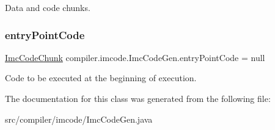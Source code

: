 Data and code chunks. \mbox{\label{classcompiler_1_1imcode_1_1_imc_code_gen_a90627f4366267feaf055da9d6d538054}} 
\subsubsection{\texorpdfstring{entry\+Point\+Code}{entryPointCode}}
{\footnotesize\ttfamily \hyperlink{classcompiler_1_1imcode_1_1_imc_code_chunk}{Imc\+Code\+Chunk} compiler.\+imcode.\+Imc\+Code\+Gen.\+entry\+Point\+Code = null}

Code to be executed at the beginning of execution. 

The documentation for this class was generated from the following file\+:\begin{DoxyCompactItemize}
\item 
src/compiler/imcode/Imc\+Code\+Gen.\+java\end{DoxyCompactItemize}
